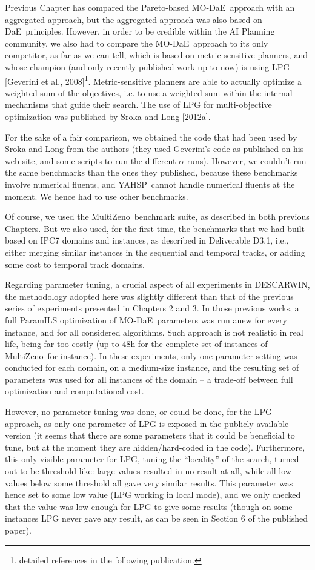 \documentclass[english]{DESCARWINreport}
\newcounter{con}
\def\DAE{{\sc DaE}}
\def\YAHSP{{\sc YAHSP}}
\def\MODAE{{\sc MO-DaE}}
\def\MULTIZENO{{\sc MultiZeno}}
\begin{document}
Previous Chapter has compared the Pareto-based \MODAE\ approach with an aggregated approach, but the aggregated approach was also based on \DAE\ principles. However, in order to be credible within the AI Planning community, we also had to compare the \MODAE\ approach to its only competitor, as far as we can tell, which is based on metric-sensitive planners, and whose champion (and only recently published work up to now) is using LPG [Geverini et al., 2008]\footnote{detailed references in the following publication.}. Metric-sensitive planners are able to actually optimize a weighted sum of the objectives, i.e. to use a weighted sum within the internal mechanisms that guide their search. The use of LPG for multi-objective optimization was published by Sroka and Long [2012a]. 

For the sake of a fair comparison, we obtained the code that had been used by Sroka and Long from the authors (they used Geverini's code as published on his web site, and some scripts to run the different $\alpha$-runs). However, we couldn't run the same benchmarks than the ones they published, because these benchmarks involve numerical fluents, and \YAHSP\ cannot handle numerical fluents at the moment. We hence had to use other benchmarks.

Of course, we used the \MULTIZENO\ benchmark suite, as described in both previous Chapters. But we also used, for the first time, the benchmarks that we had built based on IPC7 domains and instances, as described in Deliverable D3.1, i.e., either merging similar instances in the sequential and temporal tracks, or adding some cost to temporal track domains.

Regarding parameter tuning, a crucial aspect of all experiments in DESCARWIN, the methodology adopted here was slightly different than that of the previous series of experiments presented in Chapters 2 and 3. In those previous works, a full ParamILS optimization of \MODAE\ parameters was run anew for every instance, and for all considered algorithms. Such approach is not realistic in real life, being far too costly (up to 48h for the complete set of instances of \MULTIZENO\ for instance). In these experiments, only one parameter setting was conducted for each domain, on a medium-size instance, and the resulting set of parameters was used for all instances of the domain -- a trade-off between full optimization and computational cost. 

However, no parameter tuning was done, or could be done, for the LPG approach, as only one parameter of LPG is exposed in the publicly available version (it seems that there are some parameters that it could be beneficial to tune, but at the moment they are hidden/hard-coded in the code). Furthermore, this only visible parameter for LPG, tuning the ``locality'' of the search, turned out to be threshold-like: large values resulted in no result at all, while all low values below some threshold all gave very similar results. This parameter was hence set to some low value (LPG working in local mode), and we only checked that the value was low enough for LPG to give some results (though on some instances LPG never gave any result, as can be seen in Section 6 of the published paper).
\end{document}
